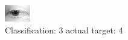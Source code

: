 \begin{figure}[h!]
\begin{center}
\includegraphics[width=0.60\columnwidth]{figures/ID2559_class_3_target_4.png}
\end{center}
\caption{ Classification: 3 actual target: 4}
\label{fig:ID2559_class_3_target_4}
\end{figure}
